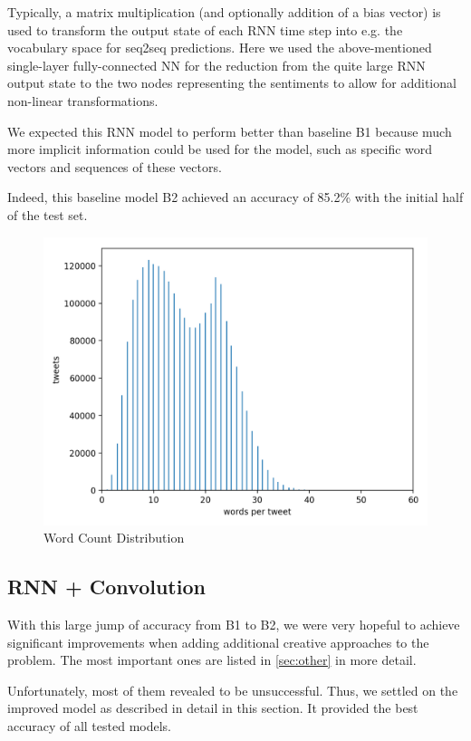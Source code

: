\documentclass[10pt,conference,compsocconf]{IEEEtran}
\begin{document}
Typically, a matrix multiplication (and optionally addition of a bias vector) is used to
transform the output state of each RNN time step into e.g. the vocabulary space
for seq2seq predictions. Here we used the above-mentioned single-layer
fully-connected NN for the reduction from the quite large RNN output state to
the two nodes representing the sentiments to allow for additional
non-linear transformations.

We expected this RNN model to perform better than baseline B1 because
much more implicit information could be used for the model, such as
specific word vectors and sequences of these vectors.

Indeed, this baseline model B2 achieved an accuracy of 85.2\% with the
initial half of the test set.

\begin{figure}[h!]
  \centering
  \includegraphics[scale=0.53]{word_count_histogram.png}
  \caption{Word Count Distribution}
  \label{fig:wordcount}
\end{figure}


\subsection{RNN + Convolution} \label{subsec:our-model}

With this large jump of accuracy from B1 to B2, we were very hopeful to
achieve significant improvements when adding additional
creative approaches to the problem. The most important ones are listed
in \autoref{sec:other} in more detail.

Unfortunately, most of them revealed to be unsuccessful. Thus, we settled on the
 improved model as described in detail in this section. It provided the best
 accuracy of all tested models. 
\end{document}
